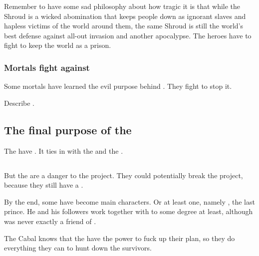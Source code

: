 Remember to have some sad philosophy about how tragic it is that while the Shroud is a wicked abomination that keeps people down as ignorant slaves and hapless victims of the world around them, the same Shroud is still the world's best defense against all-out invasion and another apocalypse. 
The heroes have to fight to keep the world as a prison. 





\subsubsection{Mortals fight against \iquin}
Some mortals have learned the evil purpose behind \iquin. 
They fight to stop it. 

Describe . 









\subsection{The final purpose of the \Sephiroth}
The  have . 
It ties in with the  and the . 







\subsection{\Kezerad}
But the  are a danger to the \Sephirah{} project. They could potentially break the project, because they still have a .

By the end, some \Kezeradi{} have become main characters. Or at least one, namely , the last \Kezeradi{} prince. He and his followers work together with \Ishna\dash to some degree at least, although \Ishnaruchaefir{} was never exactly a friend of \Kezerad. 

The Cabal knows that the \Kezeradi{} have the power to fuck up their plan, so they do everything they can to hunt down the survivors.






